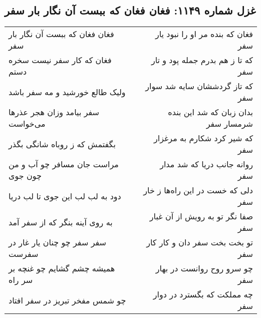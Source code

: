 \begin{center}
\section*{غزل شماره ۱۱۴۹: فغان فغان که ببست آن نگار بار سفر}
\label{sec:1149}
\begin{longtable}{l p{0.5cm} r}
فغان فغان که ببست آن نگار بار سفر
&&
فغان که بنده مر او را نبود یار سفر
\\
فغان که کار سفر نیست سخره دستم
&&
که تا ز هم بدرم جمله پود و تار سفر
\\
ولیک طالع خورشید و مه سفر باشد
&&
که تاز گردششان سایه شد سوار سفر
\\
سفر بیامد وزان هجر عذرها می‌خواست
&&
بدان زبان که شد این بنده شرمسار سفر
\\
بگفتمش که ز روباه شانگی بگذر
&&
که شیر کرد شکارم به مرغزار سفر
\\
مراست جان مسافر چو آب و من چون جوی
&&
روانه جانب دریا که شد مدار سفر
\\
دود به لب لب این جوی تا لب دریا
&&
دلی که خست در این راه‌ها ز خار سفر
\\
به روی آینه بنگر که از سفر آمد
&&
صفا نگر تو به رویش از آن غبار سفر
\\
سفر سفر چو چنان یار غار در سفرست
&&
تو بخت بخت سفر دان و کار کار سفر
\\
همیشه چشم گشایم چو غنچه بر سر راه
&&
چو سرو روح روانست در بهار سفر
\\
چو شمس مفخر تبریز در سفر افتاد
&&
چه مملکت که بگسترد در دوار سفر
\\
\end{longtable}
\end{center}
